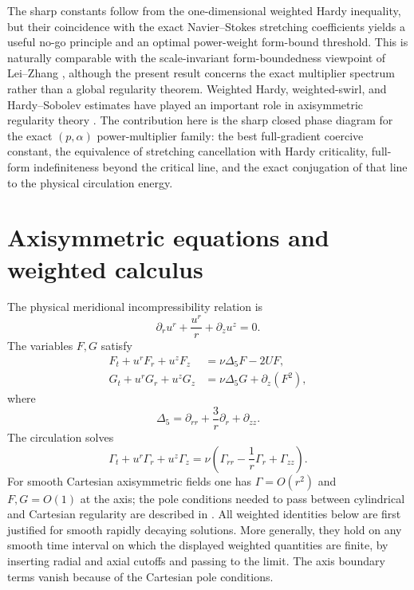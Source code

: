 \documentclass[11pt]{article}
\numberwithin{equation}{section}
\theoremstyle{remark}
\newcommand{\Da}{\Delta_5}
\begin{document}
The sharp constants follow from the one-dimensional weighted Hardy inequality, but their coincidence with the exact Navier--Stokes stretching coefficients yields a useful no-go principle and an optimal power-weight form-bound threshold.  This is naturally comparable with the scale-invariant form-boundedness viewpoint of Lei--Zhang \cite{LeiZhang2017}, although the present result concerns the exact multiplier spectrum rather than a global regularity theorem.  Weighted Hardy, weighted-swirl, and Hardy--Sobolev estimates have played an important role in axisymmetric regularity theory \cite{ChenFangZhang2017,RencZaj2019,Zhang2017,WangHuangWeiYu2024}.  The contribution here is the sharp closed phase diagram for the exact \((p,\alpha)\) power-multiplier family: the best full-gradient coercive constant, the equivalence of stretching cancellation with Hardy criticality, full-form indefiniteness beyond the critical line, and the exact conjugation of that line to the physical circulation energy.

\section{Axisymmetric equations and weighted calculus}

The physical meridional incompressibility relation is
\begin{equation}\label{eq:div3}
 \partial_r u^r+\frac{u^r}{r}+\partial_z u^z=0.
\end{equation}
The variables \(F,G\) satisfy
\begin{align}
 F_t+u^rF_r+u^zF_z
 &=\nu\Da F-2UF,\label{eq:F}\\
 G_t+u^rG_r+u^zG_z
 &=\nu\Da G+\partial_z(F^2),\label{eq:G}
\end{align}
where
\begin{equation}\label{eq:Delta5}
 \Da=\partial_{rr}+\frac3r\partial_r+\partial_{zz}.
\end{equation}
The circulation solves
\begin{equation}\label{eq:Gamma}
 \Gamma_t+u^r\Gamma_r+u^z\Gamma_z
 =\nu\left(\Gamma_{rr}-\frac1r\Gamma_r+\Gamma_{zz}\right).
\end{equation}
For smooth Cartesian axisymmetric fields one has \(\Gamma=O(r^2)\) and \(F,G=O(1)\) at the axis; the pole conditions needed to pass between cylindrical and Cartesian regularity are described in \cite{LiuWang2009}.
All weighted identities below are first justified for smooth rapidly decaying solutions.  More generally, they hold on any smooth time interval on which the displayed weighted quantities are finite, by inserting radial and axial cutoffs and passing to the limit.  The axis boundary terms vanish because of the Cartesian pole conditions.
\end{document}
